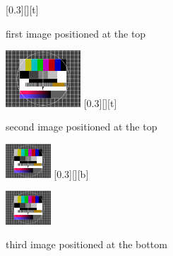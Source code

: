 \begin{filecontents*}{\democodefile}
\begin{figure}[H]
\begin{floatrow}
[0.3\textwidth][\FBheight][t]
{\caption{first image positioned at the top}
 \label{fig:floatrow:example:4:a}}
{\includegraphics[width=0.25\textwidth]{images/testimage.png}}
%
[0.3\textwidth][\FBheight][t]
{\caption{second image positioned at the top}
 \label{fig:floatrow:example:4:b}}
{\includegraphics[width=0.15\textwidth]{images/testimage.png}}
%
[0.3\textwidth][\FBheight][b]
{\caption{third image positioned at the bottom}
 \label{fig:floatrow:example:4:c}}
{\includegraphics[width=0.15\textwidth]{images/testimage.png}}
\end{floatrow}
\end{figure}
\end{filecontents*}



